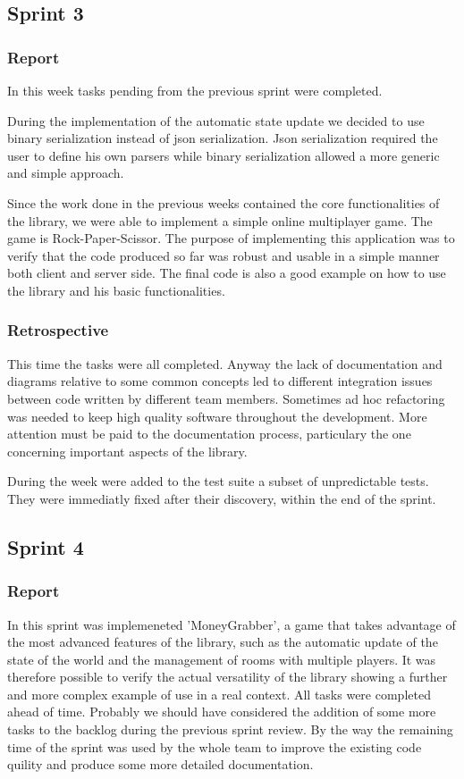 \subsection{Sprint 3}
\subsubsection{Report}

In this week tasks pending from the previous sprint were completed.

During the implementation of the automatic state update we decided to use binary serialization instead of json serialization. Json serialization required the user to define his own parsers while binary serialization allowed a more generic and simple approach.

Since the work done in the previous weeks contained the core functionalities of the library, we were able to implement a simple online multiplayer game.
The game is Rock-Paper-Scissor. 
The purpose of implementing this application was to verify that the code produced so far was robust and usable in a simple manner both client and server side.
The final code is also a good example on how to use the library and his basic functionalities.


\subsubsection{Retrospective}
This time the tasks were all completed. 
Anyway the lack of documentation and diagrams relative to some common concepts led to different integration issues  between code written by different team members. Sometimes ad hoc refactoring was needed to keep high quality software throughout the development.
More attention must be paid to the documentation process, particulary the one concerning important aspects of the library. 

During the week were added to the test suite a subset of unpredictable tests.
They were immediatly fixed after their discovery, within the end of the sprint.




\subsection{Sprint 4}
\subsubsection{Report}
In this sprint was implemeneted 'MoneyGrabber', a game that takes advantage of the most advanced features of the library, such as the automatic update of the state of the world and the management of rooms with multiple players.
It was therefore possible to verify the actual versatility of the library showing a further and more complex example of use in a real context.
All tasks were completed ahead of time.
Probably we should have considered the addition of some more tasks to the backlog during the previous sprint review. By the way the remaining time of the sprint was used by the whole team to improve the existing code quility and produce some more detailed documentation.



